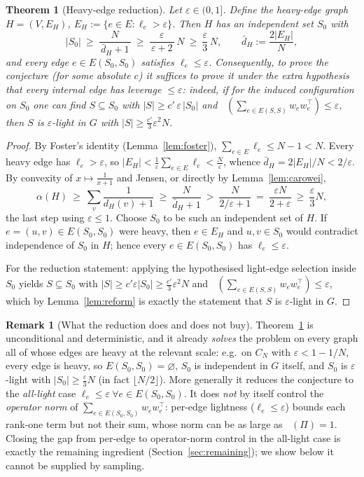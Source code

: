 \documentclass[12pt]{article}
\DeclareMathOperator*{\lammax}{\lambda_{\max}}
\newcommand{\eps}{\varepsilon}
\newtheorem{theorem}{Theorem}
\theoremstyle{definition}
\newtheorem{remark}{Remark}
\begin{document}
\begin{theorem}[Heavy-edge reduction]\label{thm:reduce}
Let $\eps\in(0,1]$. Define the \emph{heavy-edge graph}
$H=(V,E_H)$, $E_H:=\{e\in E:\ell_e>\eps\}$. Then $H$ has an independent set $S_0$
with
\[
  |S_0|\ \ge\ \frac{N}{\,\bar d_H+1\,}\ \ge\ \frac{\eps}{\,\eps+2\,}\,N\ \ge\ \frac{\eps}{3}\,N,
  \qquad \bar d_H:=\frac{2|E_H|}{N},
\]
and every edge $e\in E(S_0,S_0)$ satisfies $\ell_e\le\eps$. Consequently, to prove
the conjecture (for some absolute $c$) it suffices to prove it under the extra
hypothesis that \emph{every internal edge has leverage $\le\eps$}: indeed, if for
the induced configuration on $S_0$ one can find $S\subseteq S_0$ with
$|S|\ge c'\,\eps\,|S_0|$ and $\lammax(\sum_{e\in E(S,S)}w_ew_e^{\top})\le\eps$,
then $S$ is $\eps$-light in $G$ with $|S|\ge \tfrac{c'}{3}\eps^2 N$.
\end{theorem}

\begin{proof}
By Foster's identity (Lemma~\ref{lem:foster}), $\sum_{e\in E}\ell_e\le N-1<N$.
Every heavy edge has $\ell_e>\eps$, so
$|E_H|<\frac{1}{\eps}\sum_{e\in E}\ell_e<\frac{N}{\eps}$, whence
$\bar d_H=2|E_H|/N<2/\eps$. By convexity of $x\mapsto\frac1{x+1}$ and
Jensen, or directly by Lemma~\ref{lem:carowei},
\[
  \alpha(H)\ \ge\ \sum_{v}\frac{1}{d_H(v)+1}
  \ \ge\ \frac{N}{\bar d_H+1}
  \ >\ \frac{N}{2/\eps+1}
  \ =\ \frac{\eps N}{2+\eps}
  \ \ge\ \frac{\eps}{3}N,
\]
the last step using $\eps\le1$. Choose $S_0$ to be such an independent set of $H$.
If $e=(u,v)\in E(S_0,S_0)$ were heavy, then $e\in E_H$ and $u,v\in S_0$ would
contradict independence of $S_0$ in $H$; hence every $e\in E(S_0,S_0)$ has
$\ell_e\le\eps$.

For the reduction statement: applying the hypothesised light-edge selection inside
$S_0$ yields $S\subseteq S_0$ with $|S|\ge c'\eps|S_0|\ge \tfrac{c'}{3}\eps^2N$ and
$\lammax(\sum_{e\in E(S,S)}w_ew_e^{\top})\le\eps$, which by Lemma~\ref{lem:reform}
is exactly the statement that $S$ is $\eps$-light in $G$.
\end{proof}

\begin{remark}[What the reduction does and does not buy]\label{rem:reduce}
Theorem~\ref{thm:reduce} is unconditional and deterministic, and it already
\emph{solves} the problem on every graph all of whose edges are heavy at the
relevant scale: e.g.\ on $C_N$ with $\eps<1-1/N$, every edge is heavy, so
$E(S_0,S_0)=\varnothing$, $S_0$ is independent in $G$ itself, and $S_0$ is
$\eps$-light with $|S_0|\ge\tfrac{\eps}{3}N$ (in fact $\lfloor N/2\rfloor$). More
generally it reduces the conjecture to the \emph{all-light} case
$\ell_e\le\eps\ \forall e\in E(S_0,S_0)$. It does \emph{not} by itself control the
\emph{operator norm} of $\sum_{e\in E(S_0,S_0)}w_ew_e^{\top}$: per-edge lightness
($\ell_e\le\eps$) bounds each rank-one term but not their sum, whose norm can be
as large as $\lammax(\Pi)=1$. Closing the gap from per-edge to operator-norm
control in the all-light case is exactly the remaining ingredient
(Section~\ref{sec:remaining}); we show below it cannot be supplied by sampling.
\end{remark}
\end{document}
